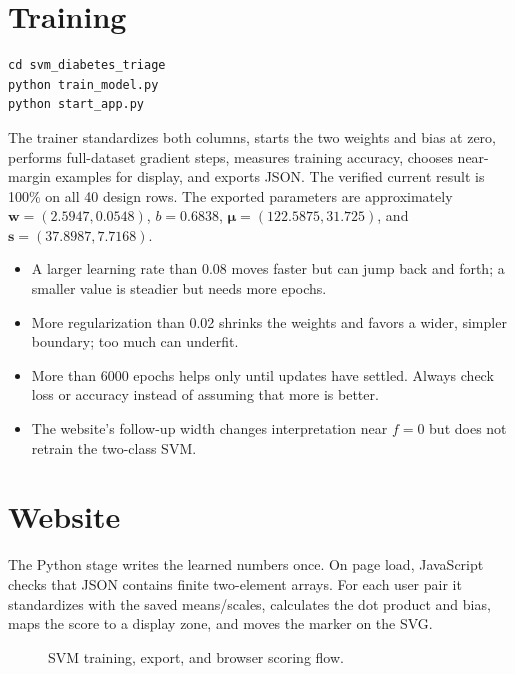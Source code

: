 \documentclass[12pt,a4paper,openany]{report}
\begin{document}
\section{Training}
\begin{lstlisting}[style=terminal]
cd svm_diabetes_triage
python train_model.py
python start_app.py
\end{lstlisting}
The trainer standardizes both columns, starts the two weights and bias at zero,
performs full-dataset gradient steps, measures training accuracy, chooses near-
margin examples for display, and exports JSON. The verified current result is
100\% on all 40 design rows. The exported parameters are approximately
$\mathbf{w}=(2.5947,0.0548)$, $b=0.6838$,
$\boldsymbol\mu=(122.5875,31.725)$, and
$\mathbf{s}=(37.8987,7.7168)$.

\begin{itemize}
  \item A larger learning rate than 0.08 moves faster but can jump back and
  forth; a smaller value is steadier but needs more epochs.
  \item More regularization than 0.02 shrinks the weights and favors a wider,
  simpler boundary; too much can underfit.
  \item More than 6000 epochs helps only until updates have settled. Always
  check loss or accuracy instead of assuming that more is better.
  \item The website's follow-up width changes interpretation near $f=0$ but
  does not retrain the two-class SVM.
\end{itemize}

\section{Website}
The Python stage writes the learned numbers once. On page load, JavaScript
checks that JSON contains finite two-element arrays. For each user pair it
standardizes with the saved means/scales, calculates the dot product and bias,
maps the score to a display zone, and moves the marker on the SVG.

\begin{figure}[H]
\centering
{}
\caption{SVM training, export, and browser scoring flow.}
\end{figure}
\end{document}
